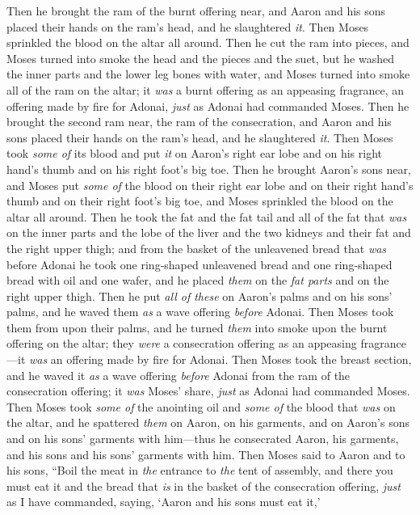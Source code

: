 \begin{biblechapter}
\verse Then he brought the ram of the burnt offering near, and Aaron and his sons placed their hands on the ram’s head,
\verse and he slaughtered \textit{it}. Then Moses sprinkled the blood on the altar all around.
\verse Then he cut the ram into pieces, and Moses turned into smoke the head and the pieces and the suet,
\verse but he washed the inner parts and the lower leg bones with water, and Moses turned into smoke all of the ram on the altar; it \textit{was} a burnt offering as an appeasing fragrance, an offering made by fire for Adonai, \textit{just} as Adonai had commanded Moses.
\verse Then he brought the second ram near, the ram of the consecration, and Aaron and his sons placed their hands on the ram’s head,
\verse and he slaughtered \textit{it}. Then Moses took \textit{some of} its blood and put \textit{it} on Aaron’s right ear lobe and on his right hand’s thumb and on his right foot’s big toe.
\verse Then he brought Aaron’s sons near, and Moses put \textit{some of} the blood on their right ear lobe and on their right hand’s thumb and on their right foot’s big toe, and Moses sprinkled the blood on the altar all around.
\verse Then he took the fat and the fat tail and all of the fat that \textit{was} on the inner parts and the lobe of the liver and the two kidneys and their fat and the right upper thigh;
\verse and from the basket of the unleavened bread that \textit{was} before Adonai he took one ring-shaped unleavened bread and one ring-shaped bread with oil and one wafer, and he placed \textit{them} on the \textit{fat parts} and on the right upper thigh.
\verse Then he put \textit{all of these} on Aaron’s palms and on his sons’ palms, and he waved them \textit{as} a wave offering \textit{before} Adonai.
\verse Then Moses took them from upon their palms, and he turned \textit{them} into smoke upon the burnt offering on the altar; they \textit{were} a consecration offering as an appeasing fragrance—it \textit{was} an offering made by fire for Adonai.
\verse Then Moses took the breast section, and he waved it \textit{as} a wave offering \textit{before} Adonai from the ram of the consecration offering; it \textit{was} Moses’ share, \textit{just} as Adonai had commanded Moses.
 Then Moses took \textit{some of} the anointing oil and \textit{some of} the blood that \textit{was} on the altar, and he spattered \textit{them} on Aaron, on his garments, and on Aaron’s sons and on his sons’ garments with him—thus he consecrated Aaron, his garments, and his sons and his sons’ garments with him.
\verse Then Moses said to Aaron and to his sons, “Boil the meat in \textit{the} entrance to \textit{the} tent of assembly, and there you must eat it and the bread that \textit{is} in the basket of the consecration offering, \textit{just} as I have commanded, saying, ‘Aaron and his sons must eat it,’

\end{biblechapter}
